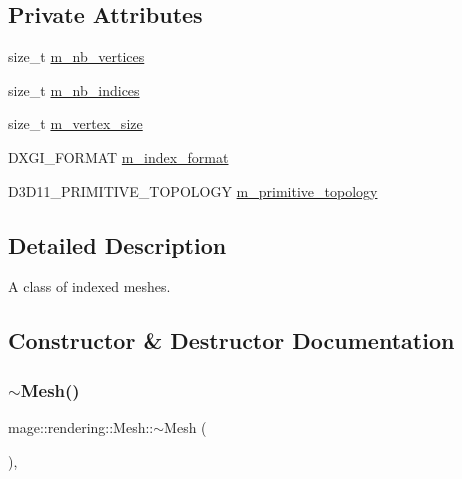 \subsection*{Private Attributes}
\begin{DoxyCompactItemize}
\item 
size\+\_\+t \mbox{\hyperlink{classmage_1_1rendering_1_1_mesh_a877873f0736375cdaa2d26066d7aa2ae}{m\+\_\+nb\+\_\+vertices}}
\item 
size\+\_\+t \mbox{\hyperlink{classmage_1_1rendering_1_1_mesh_a103e49bac28a4551816ec453e7261213}{m\+\_\+nb\+\_\+indices}}
\item 
size\+\_\+t \mbox{\hyperlink{classmage_1_1rendering_1_1_mesh_a52a754eeef69dfa642dc483025f7bb21}{m\+\_\+vertex\+\_\+size}}
\item 
D\+X\+G\+I\+\_\+\+F\+O\+R\+M\+AT \mbox{\hyperlink{classmage_1_1rendering_1_1_mesh_a3de0213af57c9d423399ad22fd6ae7c0}{m\+\_\+index\+\_\+format}}
\item 
D3\+D11\+\_\+\+P\+R\+I\+M\+I\+T\+I\+V\+E\+\_\+\+T\+O\+P\+O\+L\+O\+GY \mbox{\hyperlink{classmage_1_1rendering_1_1_mesh_a9ae7ea29fac3acb3fe17317c21242ee9}{m\+\_\+primitive\+\_\+topology}}
\end{DoxyCompactItemize}


\subsection{Detailed Description}
A class of indexed meshes. 

\subsection{Constructor \& Destructor Documentation}
\mbox{\label{classmage_1_1rendering_1_1_mesh_a3f0a53becc293987d7ecf9ca34a230d8}} 
\subsubsection{\texorpdfstring{$\sim$\+Mesh()}{~Mesh()}}
{\footnotesize\ttfamily mage\+::rendering\+::\+Mesh\+::$\sim$\+Mesh (\begin{DoxyParamCaption}{ }\end{DoxyParamCaption})\hspace{0.3cm}{\ttfamily [virtual]}, {\ttfamily [default]}}

